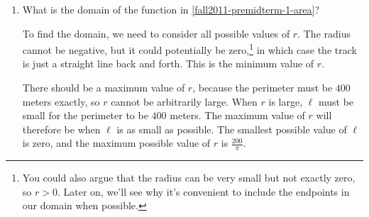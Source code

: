 \documentclass{article}
\begin{document}
\begin{enumerate}
\begin{enumerate}
\begin{solution}
      Now let's write a formula for the area enclosed by the track, which we'll
      call $A$. First, we can write
      \begin{align*}
          A &= A_\text{circle} + A_\text{rectangle}, \\
          \intertext{where $A_\text{circle}$ is the area of enclosed
          by the two semicircular ends shown in our drawing and
          $A_\text{rectangle}$ is the area of the rectangular region.
          $A_\text{circle}$  is $\pi r^2$, and $A_\text{rectangle}$ is $2r\ell$, so}
          A &= \pi r^2 + 2r\ell. \\
          \intertext{Now, to express $\ell$ in terms of $r$, we need to use the information
          given in the problem. We know that the perimeter of the track is to be $400$
          meters, so $2\pi r + 2\ell = 400$. Solving this for $\ell$, we find that
          $\ell = 200 - \pi r$. We can then substitute this into our formula for the area
          to obtain $A$ as a function of $r$.}
          A &= \pi r^2 + 2r(200-\pi r) \\
          &= 400r - \pi r^2
      \end{align*}
    \end{solution}

  \item
    \begin{problem}[\nstretch{0.25}]
      What is the domain of the function in \ref{fall2011-premidterm-1-area}? 
    \end{problem}

    \begin{solution}
      To find the domain, we need to consider all possible values of $r$. The radius
      cannot be negative, but it could potentially be
      zero,\footnote{You could also argue that the radius can be very small
      but not exactly zero, so $r > 0$. Later on, we'll see why it's
      convenient to include the endpoints in our domain when possible.}
      in which case the track is just
      a straight line back and forth. This is the minimum value of $r$.
      
      There should be a maximum value of $r$,
      because the perimeter must be $400$ meters exactly, 
      so $r$ cannot be arbitrarily large. 
      When $r$ is large, $\ell$ must be small for the perimeter to be $400$ meters. 
      The maximum value of $r$ will therefore be when $\ell$ is as small as possible.
      The smallest possible value of $\ell$ is zero, and the maximum possible value of $r$
      is $\frac{200}{\pi}$.


\end{solution}
\end{enumerate}
\end{enumerate}
\end{document}
